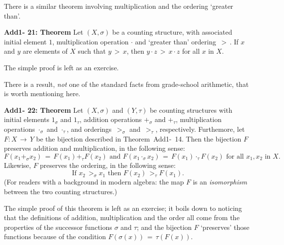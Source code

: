\V
\V

        There is a similar theorem involving multiplication and the ordering `greater than'.

\V

        {\bf Add1- 21: Theorem} Let $(X,{\sigma})$ be a counting structure, with associated initial element $1$,
    multiplication operation ${\cdot}$ and `greater than' ordering $\,>\,$.
    If $x$ and $y$  are elements of $X$ such that $y\,>\,x$,
    then $y{\cdot}z\,>\,x{\cdot}z$ for all $x$ in $X$.

\V

        The simple proof is left as an exercise.

\V
\V


        There is a result, {\em not} one  of the standard facts from grade-school arithmetic, that is worth mentioning here.

\V
\V

        {\bf Add1- 22: Theorem} Let $(X,{\sigma})$ and $(Y,{\tau})$ be counting structures with initial elements $1_{{\sigma}}$ and $1_{{\tau}}$,
    addition operations $+_{{\sigma}}$ and $+_{{\tau}}$,
    multiplication operations ${\cdot}_{{\sigma}}$ and ${\cdot}_{{\tau}}$, and orderings $\,>_{{\sigma}}$ and $\,>_{{\tau}}$, respectively.
    Furthemore, let $F:X \,{\rightarrow}\, Y$ be the bijection described in Theorem~Add1-~14.
  Then the bijection $F$ preserves addition and multiplication, in the following sense:
        \begin{displaymath}
        F(x_{1}+_{{\sigma}}x_{2}) \,=\, F(x_{1}) +_{{\tau}} F(x_{2}) \mbox{ and }
        F(x_{1}{\cdot}_{{\sigma}}x_{2}) \,=\, F(x_{1}) {\cdot}_{{\tau}} F(x_{2})
    \mbox{ for all $x_{1},x_{2}$ in $X$}.
        \end{displaymath}
    Likewise, $F$ preserves the ordering, in the following sense:
        \begin{displaymath}
        \mbox{ If $x_{2}\,>_{{\sigma}}x_{1}$ then $F(x_{2})\,>_{{\tau}}F(x_{1})$}.
        \end{displaymath}
    (For readers with a background in modern algebra: the map $F$ is an {\em isomorphism} between the two counting structures.)


    The simple proof of this theorem is left as an exercise; it boils down to noticing that the definitions of
    addition, multiplication and the order all come from the properties of  the successor functions ${\sigma}$ and ${\tau}$;
    and the bijection $F$ `preserves' those functions because of the condition $F({\sigma}(x)) \,=\, {\tau}(F(x))$.

